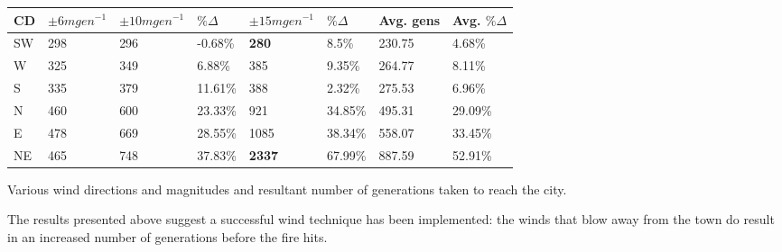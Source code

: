 \documentclass[11pt, a4paper, titlepage]{article}
\begin{document}
\begin{table}[h]
\begin{center}
      \begin{tabular}{|l|l|l|l|l|l|l|l|}
      \hline
      CD  & $\pm6mgen^{-1}$ & $\pm10mgen^{-1}$ & $\% \Delta$ & $\pm15mgen^{-1}$ & $\% \Delta$  & Avg. gens & Avg. $\% \Delta$ \\ \hline
      SW & 298                                            & 296                                        & -0.68\% & \textbf{280}                                  & 8.5\% & 230.75                            & 4.68\%      \\ \hline
      W       & 325                                            & 349                                        & 6.88\%  & 385                                  & 9.35\%  & 264.77                            & 8.11\%      \\ \hline
      S      & 335                                            & 379                                        & 11.61\% & 388                                  & 2.32\%  & 275.53                            & 6.96\%      \\ \hline
      N      & 460                                            & 600                                        & 23.33\% & 921                                  & 34.85\% & 495.31                            & 29.09\%     \\ \hline
      E       & 478                                            & 669                                        & 28.55\% & 1085                                 & 38.34\% & 558.07                            & 33.45\%     \\ \hline
      NE & 465                                            & 748                                        & 37.83\% & \textbf{2337}                                 & 67.99\% & 887.59                            & 52.91\%     \\ \hline
      \end{tabular}
\end{center}
Various wind directions and magnitudes and resultant number of generations taken to reach the city.
    \end{table}

    The results presented above suggest a successful wind technique has been implemented: the winds that blow away from the town do result in an increased number of generations before the fire hits.
    
\end{document}
